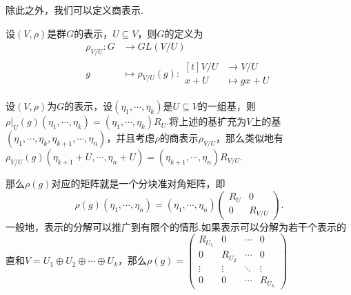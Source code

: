 除此之外，我们可以定义商表示.
\begin{definition}
    设$(V,\rho)$是群$G$的表示，$U\subseteq V$，则$G$的定义为
    \begin{align*}
        \rho_{V/U}:G&\to GL(V/U) \\[-2pt]
        g&\mapsto \rho_{V/U}(g):\begin{aligned}[t]
            V/U&\to V/U \\[-4pt]
            x+U&\mapsto gx+U
        \end{aligned}
    \end{align*}
\end{definition}

设$(V,\rho)$为$G$的表示，设$(\eta_1,\cdots,\eta_k)$是$U\subseteq V$的一组基，则$\rho|_U(g)(\eta_1,\cdots,\eta_k)=(\eta_1,\cdots,\eta_k)R_{U}$.将上述的基扩充为$V$上的基$(\eta_1,\cdots,\eta_k,\eta_{k+1},\cdots,\eta_n)$，并且考虑$\rho$的商表示$\rho_{V/U}$，那么类似地有$\rho_{V/U}(g)(\eta_{k+1}+U,\cdots,\eta_n+U)=(\eta_{k+1},\cdots,\eta_n)R_{V/U}$.\par
那么$\rho(g)$对应的矩阵就是一个分块准对角矩阵，即
\begin{equation*}
    \rho(g)(\eta_1,\cdots,\eta_n)=(\eta_1,\cdots,\eta_n)\begin{pmatrix}
    R_U & 0 \\
    0 & R_{V/U}
\end{pmatrix}.
\end{equation*}
一般地，表示的分解可以推广到有限个的情形.如果表示可以分解为若干个表示的直和$V=U_1\oplus U_2\oplus\cdots\oplus U_k$，那么$\rho(g)=\begin{pmatrix}
    R_{U_1} & 0 & \cdots & 0 \\
    0 & R_{U_2} & \cdots & 0 \\
    \vdots & \vdots & \ddots & \vdots \\
    0 & 0 & \cdots & R_{U_k}
\end{pmatrix}$\par

